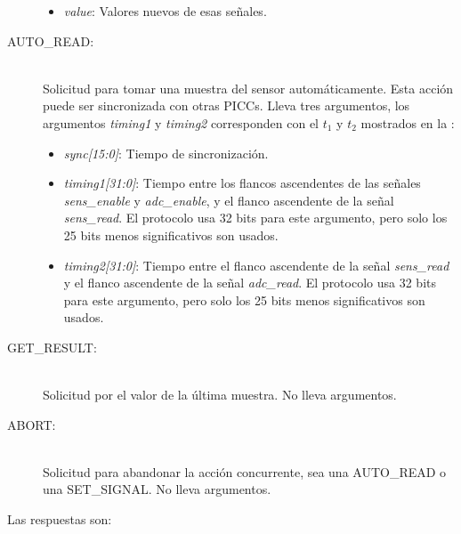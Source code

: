 \documentclass[a4paper, twoside, 11pt]{report}
\begin{document}
\begin{description}
\begin{itemize}
    \item \textit{value}: Valores nuevos de esas señales.
  \end{itemize}
  \item[AUTO\_READ:] \hfill \\ Solicitud para tomar una muestra del sensor automáticamente. Esta acción puede ser sincronizada con otras PICCs. Lleva tres argumentos, los argumentos \textit{timing1} y \textit{timing2} corresponden con el $t_1$ y $t_2$ mostrados en la :
  \begin{itemize}
    \item \textit{sync[15:0]}: Tiempo de sincronización.
    \item \textit{timing1[31:0]}: Tiempo entre los flancos ascendentes de las señales \textit{sens\_enable} y \textit{adc\_enable}, y el flanco ascendente de la señal \textit{sens\_read}. El protocolo usa 32 bits para este argumento, pero solo los 25 bits menos significativos son usados.
    \item \textit{timing2[31:0]}: Tiempo entre el flanco ascendente de la señal \textit{sens\_read} y el flanco ascendente de la señal \textit{adc\_read}. El protocolo usa 32 bits para este argumento, pero solo los 25 bits menos significativos son usados.
  \end{itemize}
  \item[GET\_RESULT:] \hfill \\ Solicitud por el valor de la última muestra. No lleva argumentos.
  \item[ABORT:] \hfill \\ Solicitud para abandonar la acción concurrente, sea una AUTO\_READ o una SET\_SIGNAL. No lleva argumentos.
\end{description}

Las respuestas son:
\end{document}
